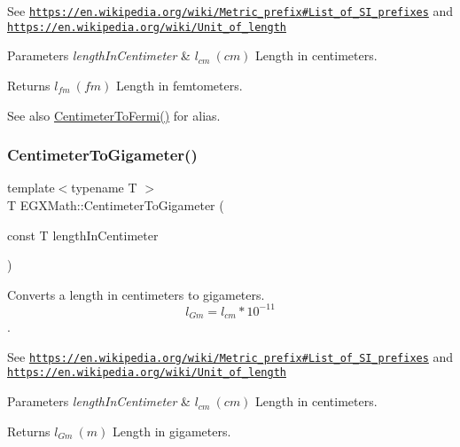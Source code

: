 See \href{https://en.wikipedia.org/wiki/Metric_prefix#List_of_SI_prefixes}{\tt https\+://en.\+wikipedia.\+org/wiki/\+Metric\+\_\+prefix\#\+List\+\_\+of\+\_\+\+S\+I\+\_\+prefixes} and \href{https://en.wikipedia.org/wiki/Unit_of_length}{\tt https\+://en.\+wikipedia.\+org/wiki/\+Unit\+\_\+of\+\_\+length} 
\begin{DoxyParams}{Parameters}
{\em length\+In\+Centimeter} & $ l_{cm}\ (cm)$ Length in centimeters. \\
\hline
\end{DoxyParams}
\begin{DoxyReturn}{Returns}
$ l_{fm}\ (fm)$ Length in femtometers. 
\end{DoxyReturn}
\begin{DoxySeeAlso}{See also}
\mbox{\hyperlink{group___e_g_x_math-_conversions-_length_conversions-_centimeter-_non-_s_i_ga0b55e847f11e0ba8313d4556d23684dd}{Centimeter\+To\+Fermi()}} for alias. 
\end{DoxySeeAlso}
\mbox{\label{group___e_g_x_math-_conversions-_length_conversions-_centimeter-_s_i_gaf3656a809d74231d75f33a9485e4f454}} 
\subsubsection{\texorpdfstring{Centimeter\+To\+Gigameter()}{CentimeterToGigameter()}}
{\footnotesize\ttfamily template$<$typename T $>$ \\
T E\+G\+X\+Math\+::\+Centimeter\+To\+Gigameter (\begin{DoxyParamCaption}\item[{const T}]{length\+In\+Centimeter }\end{DoxyParamCaption})}



Converts a length in centimeters to gigameters. \[ l_{Gm}=l_{cm} * 10^{-11} \]. 

See \href{https://en.wikipedia.org/wiki/Metric_prefix#List_of_SI_prefixes}{\tt https\+://en.\+wikipedia.\+org/wiki/\+Metric\+\_\+prefix\#\+List\+\_\+of\+\_\+\+S\+I\+\_\+prefixes} and \href{https://en.wikipedia.org/wiki/Unit_of_length}{\tt https\+://en.\+wikipedia.\+org/wiki/\+Unit\+\_\+of\+\_\+length} 
\begin{DoxyParams}{Parameters}
{\em length\+In\+Centimeter} & $ l_{cm}\ (cm)$ Length in centimeters. \\
\hline
\end{DoxyParams}
\begin{DoxyReturn}{Returns}
$ l_{Gm}\ (m)$ Length in gigameters. 
\end{DoxyReturn}
\mbox{\label{group___e_g_x_math-_conversions-_length_conversions-_centimeter-_s_i_ga311c96c2d32cb295453bff9cbdfd8cdc}} 
